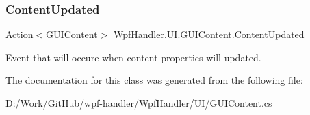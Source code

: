 \subsubsection{\texorpdfstring{Content\+Updated}{ContentUpdated}}
{\footnotesize\ttfamily Action$<$\mbox{\hyperlink{class_wpf_handler_1_1_u_i_1_1_g_u_i_content}{G\+U\+I\+Content}}$>$ Wpf\+Handler.\+U\+I.\+G\+U\+I\+Content.\+Content\+Updated}



Event that will occure when content properties will updated. 



The documentation for this class was generated from the following file\+:\begin{DoxyCompactItemize}
\item 
D\+:/\+Work/\+Git\+Hub/wpf-\/handler/\+Wpf\+Handler/\+U\+I/G\+U\+I\+Content.\+cs\end{DoxyCompactItemize}
